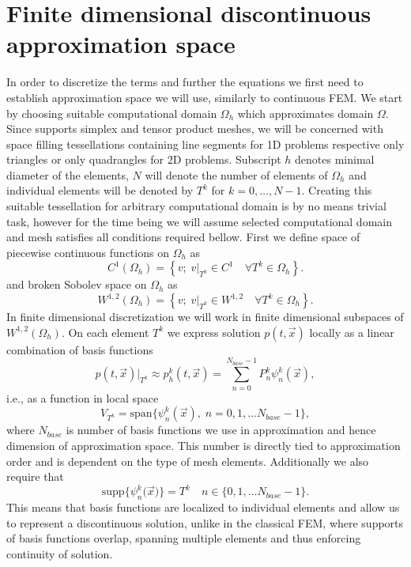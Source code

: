 \section{Finite dimensional discontinuous approximation space}
In order to discretize the terms and further the equations we first need to 
establish approximation space we will use, similarly to continuous FEM. We 
start by choosing suitable computational domain $\Omega_h$ which approximates 
domain $\Omega$. Since \sfepy{} supports simplex and tensor product meshes, we 
will be concerned with space filling tessellations containing line segments 
for 1D problems respective only triangles or only quadrangles for 2D 
problems. Subscript $h$ denotes minimal diameter of the elements, 
$N$ will denote the number of elements of $\Omega_h$ and individual elements 
will be denoted by $T^k$ for $k=0, \ldots, N - 1$. Creating this suitable 
tessellation for arbitrary computational domain is by no means trivial task, 
however for the time being we will assume selected computational domain and 
mesh satisfies all conditions required bellow. First we define space of 
piecewise continuous functions  on $\Omega_h$ as 
\begin{equation}
\label{eq:sp_conth}
C^1(\Omega_h) =  \left\{v;\; v\vert_{T^k} \in C^1 \quad \forall T^k \in 
\Omega_h \right\}.
\end{equation}
and broken Sobolev space on $\Omega_h$ as
\begin{equation}
\label{eq:sp_sobh}
W^{1, 2}(\Omega_h) = \left\{v;\; v\vert_{T^k} \in W^{1, 2}\quad \forall T^k 
\in \Omega_h \right\}.
\end{equation}
In finite dimensional discretization we will work in finite dimensional 
subspaces of $W^{1, 2}(\Omega_h)$. On each element $T^k$ we express 
solution $p(t, \vec{x})$ locally as a linear combination of basis functions
\begin{equation}
\label{eq:el_lin_comb}
p(t, \vec{x})|_{T^k} \approx p_h^k(t, \vec{x}) = \sum\limits_{n=0}^{N_{base} - 1} 
P_n^k\psi^k_n(\vec{x}),
\end{equation}
i.e., as a function in local space
\begin{equation}
V_{T^k} = \text{span}\big\{ \psi_n^k(\vec{x}), \; n = 0,1, \dots  
N_{base}-1\big\},
\end{equation}
where $N_{base}$ is number of basis functions we use in approximation and hence 
dimension of approximation space. This number is directly tied to approximation 
order and is dependent on the type of mesh elements. Additionally we also require that
\begin{equation}
\text{supp}\big\{\psi_n^k(\vec{x}\big)\} = T^k \quad n \in \{0,1, 
\dots  N_{base}-1\}.
\end{equation}
This means that basis functions are localized to individual elements and allow 
us to represent a discontinuous solution, unlike in the classical FEM, where 
supports of basis functions overlap, spanning multiple elements and  thus 
enforcing continuity of solution.

